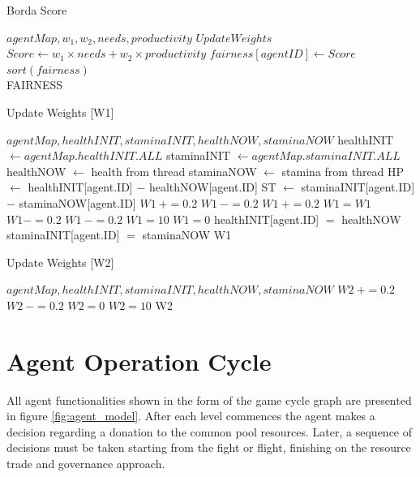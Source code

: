 \begin{algorithm}
\caption{Borda Score}
\begin{algorithmic} 
\Require $agentMap, w_1, w_2, needs, productivity$
\State $Update Weights$
\State $Score \leftarrow w_1 \times needs + w_2 \times productivity$
\State $fairness[agentID] \leftarrow Score$
\EndWhile
\State $sort(fairness)$\\
\Return FAIRNESS
\end{algorithmic}
\end{algorithm}


\begin{algorithm}
\caption{Update Weights [W1]}
\begin{algorithmic} 
\Require $agentMap, healthINIT, staminaINIT,healthNOW, staminaNOW$
\State healthINIT $\leftarrow agentMap.healthINIT.ALL$
\State staminaINIT $\leftarrow agentMap.staminaINIT.ALL$
\State healthNOW $\leftarrow$ health from thread
\State staminaNOW $\leftarrow$ stamina from thread
\State HP $\leftarrow$ healthINIT[agent.ID] $-$ healthNOW[agent.ID]
\State ST $\leftarrow$ staminaINIT[agent.ID] $-$ staminaNOW[agent.ID]
\State $W1~+= 0.2$
\Else
\State $W1~-= 0.2$
\EndIf
{}
\State $W1~+= 0.2$
\Else
{}
\State $W1 = W1$
\Else
\State $W1 -= 0.2$
\EndIf
\State $W1~-= 0.2$
\EndIf
{}
\State $W1=10$
\EndIf
{}
\State $W1 = 0$
\EndIf
\State healthINIT[agent.ID] $=$ healthNOW
\State staminaINIT[agent.ID] $=$ staminaNOW
\Return W1
\EndIf
\end{algorithmic}
\end{algorithm}


\begin{algorithm}
\caption{Update Weights [W2]}
\begin{algorithmic} 
\Require $agentMap, healthINIT, staminaINIT,healthNOW, staminaNOW$
\State $W2~+= 0.2$
\Else
\State $W2~-= 0.2$
\EndIf
{}
\State $W2 = 0$
\EndIf
{}
\State $W2 = 10$
\EndIf
\State
\Return W2
\end{algorithmic}
\end{algorithm}


\clearpage
\section{Agent Operation Cycle}

All agent functionalities shown in the form of the game cycle graph are presented in figure \ref{fig:agent_model}. After each level commences the agent makes a decision regarding a donation to the common pool resources. Later, a sequence of decisions must be taken starting from the fight or flight, finishing on the resource trade and governance approach.

